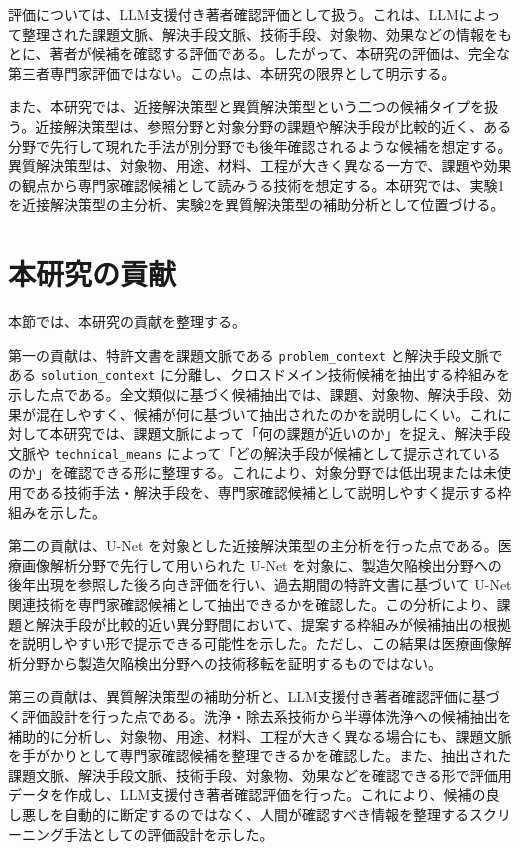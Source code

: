評価については、LLM支援付き著者確認評価として扱う。これは、LLMによって整理された課題文脈、解決手段文脈、技術手段、対象物、効果などの情報をもとに、著者が候補を確認する評価である。したがって、本研究の評価は、完全な第三者専門家評価ではない。この点は、本研究の限界として明示する。

また、本研究では、近接解決策型と異質解決策型という二つの候補タイプを扱う。近接解決策型は、参照分野と対象分野の課題や解決手段が比較的近く、ある分野で先行して現れた手法が別分野でも後年確認されるような候補を想定する。異質解決策型は、対象物、用途、材料、工程が大きく異なる一方で、課題や効果の観点から専門家確認候補として読みうる技術を想定する。本研究では、実験1を近接解決策型の主分析、実験2を異質解決策型の補助分析として位置づける。

\section{本研究の貢献}

本節では、本研究の貢献を整理する。

第一の貢献は、特許文書を課題文脈である \texttt{problem\_context} と解決手段文脈である \texttt{solution\_context} に分離し、クロスドメイン技術候補を抽出する枠組みを示した点である。全文類似に基づく候補抽出では、課題、対象物、解決手段、効果が混在しやすく、候補が何に基づいて抽出されたのかを説明しにくい。これに対して本研究では、課題文脈によって「何の課題が近いのか」を捉え、解決手段文脈や \texttt{technical\_means} によって「どの解決手段が候補として提示されているのか」を確認できる形に整理する。これにより、対象分野では低出現または未使用である技術手法・解決手段を、専門家確認候補として説明しやすく提示する枠組みを示した。

第二の貢献は、U-Net を対象とした近接解決策型の主分析を行った点である。医療画像解析分野で先行して用いられた U-Net を対象に、製造欠陥検出分野への後年出現を参照した後ろ向き評価を行い、過去期間の特許文書に基づいて U-Net 関連技術を専門家確認候補として抽出できるかを確認した。この分析により、課題と解決手段が比較的近い異分野間において、提案する枠組みが候補抽出の根拠を説明しやすい形で提示できる可能性を示した。ただし、この結果は医療画像解析分野から製造欠陥検出分野への技術移転を証明するものではない。

第三の貢献は、異質解決策型の補助分析と、LLM支援付き著者確認評価に基づく評価設計を行った点である。洗浄・除去系技術から半導体洗浄への候補抽出を補助的に分析し、対象物、用途、材料、工程が大きく異なる場合にも、課題文脈を手がかりとして専門家確認候補を整理できるかを確認した。また、抽出された課題文脈、解決手段文脈、技術手段、対象物、効果などを確認できる形で評価用データを作成し、LLM支援付き著者確認評価を行った。これにより、候補の良し悪しを自動的に断定するのではなく、人間が確認すべき情報を整理するスクリーニング手法としての評価設計を示した。

